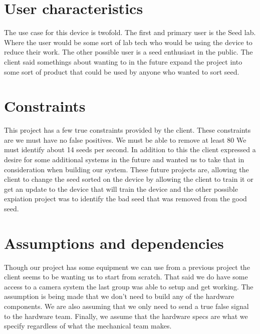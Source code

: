 \documentclass[onecolumn, draftclsnofoot,10pt, compsoc]{IEEEtran}
\begin{document}
\section{User characteristics}
The use case for this device is twofold.
The first and primary user is the Seed lab.
Where the user would be some sort of lab tech who would be using the device to reduce their work.
The other possible user is a seed enthusiast in the public.
The client said somethings about wanting to in the future expand the project into some sort of product that could be used by anyone who wanted to sort seed.
\section{Constraints}
This project has a few true constraints provided by the client.
These constraints are we must have no false positives. We must be able to remove at least 80%
We must identify about 14 seeds per second.
In addition to this the client expressed a desire for some additional systems in the future and wanted us to take that in consideration when building our system.
These future projects are, allowing the client to change the seed sorted on the device by allowing the client to train it or get an update to the device that will train the device and the other possible expiation project was to identify the bad seed that was removed from the good seed.
\section{Assumptions and dependencies}
Though our project has some equipment we can use from a previous project the client seems to be wanting us to start from scratch.
That said we do have some access to a camera system the last group was able to setup and get working.
The assumption is being made that we don’t need to build any of the hardware components.
We are also assuming that we only need to send a true false signal to the hardware team.
Finally, we assume that the hardware specs are what we specify regardless of what the mechanical team makes.
\end{document}
